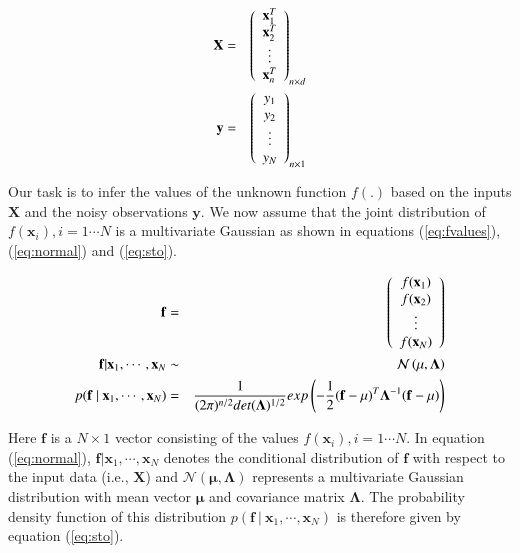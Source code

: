 \documentclass[referee,a4paper,12pt,traditabstract]{swsc}
\begin{document}
\begin{linenumbers}
\begin{eqnarray}
  \mathbf{X} & = & \left( \begin{array}{c} \mathbf{x}^{T}_1 \\ \mathbf{x}^{T}_2 \\ \vdots \\ \mathbf{x}^{T}_n \end{array} \right)_{n \times d} \label{eq:feat} \\
  \vspace{2\baselineskip}
  \mathbf{y} & = & \left( \begin{array}{c} y_1 \\ y_2 \\ \vdots \\ y_N \end{array} \right) _{n \times 1} \label{eq:labels}
\end{eqnarray}

Our task is to infer the values of the unknown function $f(.)$ based on the inputs $\mathbf{X}$ and the noisy observations $\mathbf{y}$. We now assume that the joint distribution of $f(\mathbf{x}_i), i = 1 \cdots N$ is a multivariate Gaussian as shown in equations (\ref{eq:fvalues}), (\ref{eq:normal}) and (\ref{eq:sto}).

\begin{eqnarray}
 \mathbf{f} & = & \left( \begin{array}{c} f(\mathbf{x}_1) \\ f(\mathbf{x}_2) \\ \vdots \\ f(\mathbf{x}_N) \end{array} \right) \label{eq:fvalues}\\
 \vspace{2\baselineskip}
 \mathbf{f} | \mathbf{x}_1, \cdots, \mathbf{x}_N & \sim & \mathcal{N}\left( \mathbf{\mu}, \mathbf{\Lambda} \right)  \label{eq:normal}\\
 \vspace{2\baselineskip}
 p( \mathbf{f} \ | \ \mathbf{x}_1, \cdots, \mathbf{x}_N) & = & \frac{1}{(2\pi)^{n/2} det(\mathbf{\Lambda})^{1/2}} exp \left(-\frac{1}{2} (\mathbf{f} - \mathbf{\mu})^T \mathbf{\Lambda}^{-1} (\mathbf{f} - \mathbf{\mu}) \right) \label{eq:sto}
\end{eqnarray}

Here $\mathbf{f}$ is a $N\times 1$ vector consisting of the values $f(\mathbf{x}_i), i = 1 \cdots N$. In equation (\ref{eq:normal}), $\mathbf{f}|\mathbf{x}_1, \cdots, \mathbf{x}_N$ denotes the conditional distribution of $\mathbf{f}$ with respect to the input data (i.e., $\mathbf{X}$) and $\mathcal{N}\left( \mathbf{\mu}, \mathbf{\Lambda} \right)$ represents a multivariate Gaussian distribution with mean vector $\mathbf{\mu}$ and covariance matrix $\mathbf{\Lambda}$. The probability density function of this distribution $p( \mathbf{f} \ | \ \mathbf{x}_1, \cdots, \mathbf{x}_N)$ is therefore given by equation (\ref{eq:sto}).


\end{linenumbers}
\end{document}
